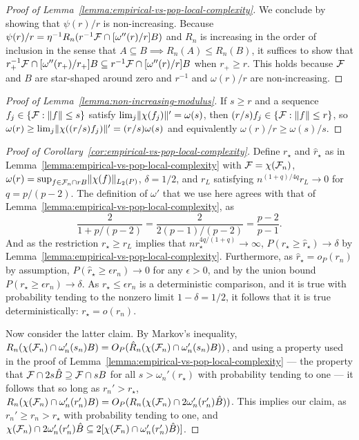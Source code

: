 \begin{proof}[Proof of Lemma~\ref{lemma:empirical-vs-pop-local-complexity}]
We conclude by showing that $\psi(r)/r$ is non-increasing.
Because $\psi(r)/r = \eta^{-1} R_n(r^{-1}\mathcal{F} \cap [\omega''(r)/r]B)$
and $R_n$ is increasing in the order of inclusion in the sense that $A \subseteq B \implies R_n(A) \le R_n(B)$,
it suffices to show that $r_+^{-1}\mathcal{F} \cap [\omega''(r_+)/r_+] B \subseteq r^{-1}\mathcal{F} \cap [\omega''(r)/r] B$
when $r_+ \ge r$. This holds because $\mathcal{F}$ and $B$ are star-shaped around zero
and $r^{-1}$ and $\omega(r)/r$ are non-increasing.
\end{proof}

\begin{proof}[Proof of Lemma~\ref{lemma:non-increasing-modulus}]
If $s \ge r$ and a sequence $f_j \in \{\mathcal{F} : \lVert f\rVert \le s\}$ satisfy $\lim_{j}\lVert\chi(f_j)\rVert' = \omega(s)$,
then $(r/s)f_j \in \{\mathcal{F} : \lVert f\rVert \le r \}$, so $\omega(r) \ge \lim_{j} \lVert\chi((r/s)f_j)\rVert' = (r/s)\omega(s)$ and equivalently $\omega(r)/r \ge \omega(s)/s$.
\end{proof}

\begin{proof}[Proof of Corollary~\ref{cor:empirical-vs-pop-local-complexity}]
Define $r_{\star}$ and $\hat r_{\star}$ as in Lemma~\ref{lemma:empirical-vs-pop-local-complexity} with $\mathcal{F} = \chi(\mathcal{F}_n)$,
$\omega(r)=\sup_{f \in \F_n \cap r B} \norm{\chi(f)}_{L_2(\P)}$, $\delta=1/2$, and $r_L$ satisfying $n^{(1+q)/4q}r_L \to 0$
for $q=p/(p-2)$. The definition of $\omega'$ that we use here agrees with that of Lemma~\ref{lemma:empirical-vs-pop-local-complexity},
as 
\[ \frac{2}{1 + p/(p-2)} = \frac{2}{2(p-1)/(p-2)} = \frac{p-2}{p-1}. \] 
And as the restriction $r_{\star} \ge r_L$ implies that $n r_\star^{4q/(1+q)} \to \infty$,
$P(r_\star \ge \hat r_{\star}) \to \delta$ by Lemma~\ref{lemma:empirical-vs-pop-local-complexity}.
Furthermore, as $\hat r_{\star} = o_P(r_n)$ by assumption,
$P(\hat r_{\star} \ge \epsilon r_n) \to 0$ for any $\epsilon > 0$, and by the union bound
$P(r_\star \ge \epsilon r_n) \to \delta$. As $r_\star \le \epsilon r_n$ is a deterministic comparison,
and it is true with probability tending to the nonzero limit $1 - \delta=1/2$, 
it follows that it is true deterministically: $r_\star = o(r_n)$. 

Now consider the latter claim. By Markov's inequality, $R_n(\chi(\mathcal{F}_n) \cap \omega_n'(s_n)B) = O_P( \hat R_n(\chi(\mathcal{F}_n) \cap \omega_n'(s_n) B))$,
and using a property used in the proof of Lemma~\ref{lemma:empirical-vs-pop-local-complexity}
--- the property that $\mathcal{F} \cap 2s\hat B \supseteq \mathcal{F} \cap sB$ for all $s > \omega_n'(r_{\star})$ 
with probability tending to one --- it follows that so long as $r_n' > r_{\star}$,
$R_n(\chi(\mathcal{F}_n) \cap \omega_n'(r_n')B) = O_P(R_n(\chi(\mathcal{F}_n) \cap 2\omega_n'(r_n')\hat B))$.
This implies our claim, as $r_n' \ge r_n > r_{\star}$ with probability tending to one, and 
$\chi(\mathcal{F}_n) \cap 2\omega_n'(r_n')\hat B \subseteq  2[ \chi(\mathcal{F}_n) \cap \omega_n'(r_n')\hat B)]$.
\end{proof}


